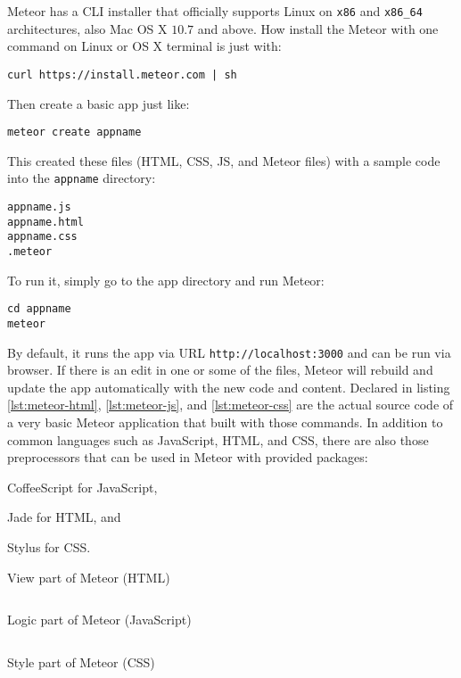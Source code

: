 Meteor has a \ac{CLI} installer that officially supports Linux on \verb|x86| and \verb|x86_64| architectures, also Mac OS X $10.7$ and above.
How install the Meteor with one command on Linux or OS X terminal is just with:

\begin{verbatim}
curl https://install.meteor.com | sh
\end{verbatim}

\noindent Then create a basic app just like:

\begin{verbatim}
meteor create appname
\end{verbatim}

This created these files (\ac{HTML}, \ac{CSS}, \ac{JS}, and Meteor files) with a sample code into the \verb|appname| directory:

\begin{verbatim}
appname.js
appname.html
appname.css
.meteor
\end{verbatim}

To run it, simply go to the app directory and run Meteor:

\begin{verbatim}
cd appname
meteor
\end{verbatim}

By default, it runs the app via \ac{URL} \verb|http://localhost:3000| and can be run via browser.
If there is an edit in one or some of the files, Meteor will rebuild and update the app automatically with the new code and content.
\noindent Declared in listing \autoref{lst:meteor-html}, \autoref{lst:meteor-js}, and \autoref{lst:meteor-css} are the actual source code of a very basic Meteor application that built with those commands.
In addition to common languages such as JavaScript, \ac{HTML}, and \ac{CSS}, there are also those preprocessors that can be used in Meteor with provided packages:
\begin{inparaenum}[\itshape 1\upshape)]
\item CoffeeScript for JavaScript,
\item Jade for \ac{HTML}, and
\item Stylus for \ac{CSS}.
\end{inparaenum}

\begin{listing}[htp]
\caption{View part of Meteor (HTML)}
\inputminted{html}{\dir/include/meteor/meteor.html}
\label{lst:meteor-html}
\end{listing}

\begin{listing}[htp]
\caption{Logic part of Meteor (JavaScript)}
\inputminted{javascript}{\dir/include/meteor/meteor.js}
\label{lst:meteor-js}
\end{listing}

\begin{listing}[htp]
\caption{Style part of Meteor (CSS)}
\inputminted{css}{\dir/include/meteor/meteor.css}
\label{lst:meteor-css}
\end{listing}
